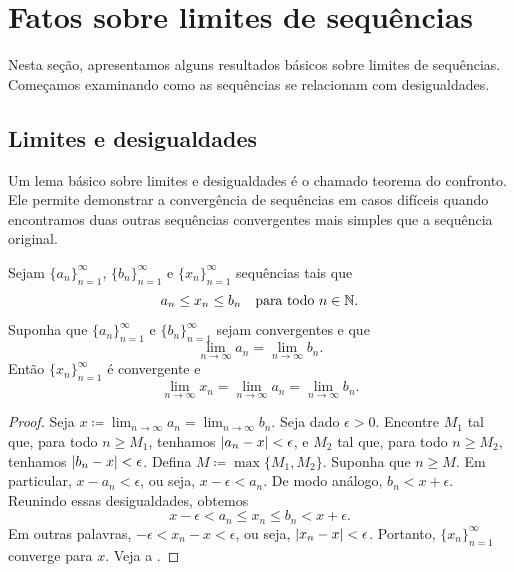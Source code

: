 
\sectionnewpage
\section{Fatos sobre limites de sequências}
\label{sec:factslimsseqs}



Nesta seção, apresentamos alguns resultados básicos sobre limites de
sequências.
Começamos examinando como as sequências se relacionam com desigualdades.

\subsection{Limites e desigualdades}

Um lema básico sobre limites e desigualdades é o chamado teorema do confronto.
Ele permite demonstrar a convergência de sequências em casos difíceis
quando encontramos duas outras sequências convergentes mais simples que
 a sequência original.

\begin{lemma} \label{squeeze:lemma}
Sejam $\{ a_n \}_{n=1}^\infty$,
$\{ b_n \}_{n=1}^\infty$ e
$\{ x_n \}_{n=1}^\infty$ sequências tais que
\begin{equation*}
a_n \leq x_n \leq b_n \quad \text{para todo } n \in {\mathbb{N}}.
\end{equation*}
Suponha que $\{ a_n \}_{n=1}^\infty$ e $\{ b_n \}_{n=1}^\infty$ sejam convergentes e que
\begin{equation*}
\lim_{n\to \infty} a_n
=
\lim_{n\to \infty} b_n .
\end{equation*}
Então $\{ x_n \}_{n=1}^\infty$ é convergente e
\begin{equation*}
\lim_{n\to \infty} x_n
=
\lim_{n\to \infty} a_n
=
\lim_{n\to \infty} b_n .
\end{equation*}
\end{lemma}

\begin{proof}
Seja $x \coloneqq \lim_{n\to\infty} a_n = \lim_{n\to\infty} b_n$.
Seja dado $\epsilon > 0$.
Encontre $M_1$ tal que, para todo $n \geq M_1$, tenhamos
$\lvert {a_n-x} \rvert < \epsilon$, e $M_2$ tal que, para todo $n \geq M_2$,
tenhamos $\lvert {b_n-x} \rvert < \epsilon$. Defina $M \coloneqq \max \{M_1, M_2 \}$.
Suponha que $n \geq M$.
Em particular,
$x - a_n < \epsilon$, ou seja,
$x - \epsilon < a_n$. De modo análogo, $b_n < x + \epsilon$.
Reunindo essas desigualdades, obtemos
\begin{equation*}
x - \epsilon < a_n \leq x_n \leq b_n < x + \epsilon .
\end{equation*}
Em outras palavras, $-\epsilon < x_n-x < \epsilon$, ou seja,
$\lvert {x_n-x} \rvert < \epsilon$.
Portanto, $\{x_n\}_{n=1}^\infty$ converge para $x$.
Veja a .
\end{proof}

